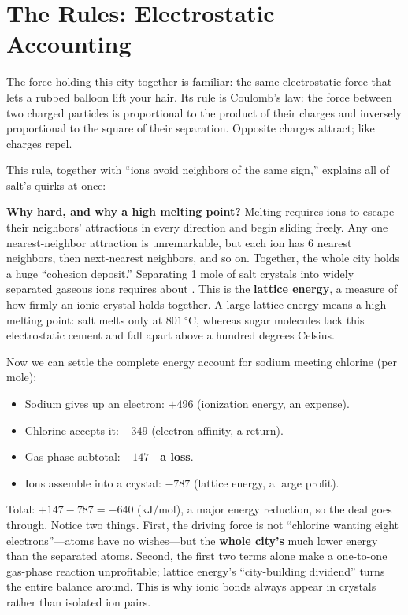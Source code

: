 \section{The Rules: Electrostatic Accounting}

The force holding this city together is familiar: the same electrostatic force that lets a rubbed balloon lift your hair. Its rule is Coulomb's law: the force between two charged particles is proportional to the product of their charges and inversely proportional to the square of their separation. Opposite charges attract; like charges repel.

This rule, together with ``ions avoid neighbors of the same sign,'' explains all of salt's quirks at once:

\textbf{Why hard, and why a high melting point?} Melting requires ions to escape their neighbors' attractions in every direction and begin sliding freely. Any one nearest-neighbor attraction is unremarkable, but each ion has 6 nearest neighbors, then next-nearest neighbors, and so on. Together, the whole city holds a huge ``cohesion deposit.'' Separating 1 mole of salt crystals into widely separated gaseous ions requires about . This is the \textbf{lattice energy}, a measure of how firmly an ionic crystal holds together. A large lattice energy means a high melting point: salt melts only at $801\,^{\circ}\mathrm{C}$, whereas sugar molecules lack this electrostatic cement and fall apart above a hundred degrees Celsius.

\begin{qiaoliang}
Now we can settle the complete energy account for sodium meeting chlorine (per mole):
\begin{itemize}[itemsep=1pt]
\item Sodium gives up an electron: $+496$ (ionization energy, an expense).
\item Chlorine accepts it: $-349$ (electron affinity, a return).
\item Gas-phase subtotal: $+147$---\textbf{a loss}.
\item Ions assemble into a crystal: $-787$ (lattice energy, a large profit).
\end{itemize}
Total: $+147-787=-640$ (kJ/mol), a major energy reduction, so the deal goes through. Notice two things. First, the driving force is not ``chlorine wanting eight electrons''---atoms have no wishes---but the \textbf{whole city's} much lower energy than the separated atoms. Second, the first two terms alone make a one-to-one gas-phase reaction unprofitable; lattice energy's ``city-building dividend'' turns the entire balance around. This is why ionic bonds always appear in crystals rather than isolated ion pairs.
\end{qiaoliang}

